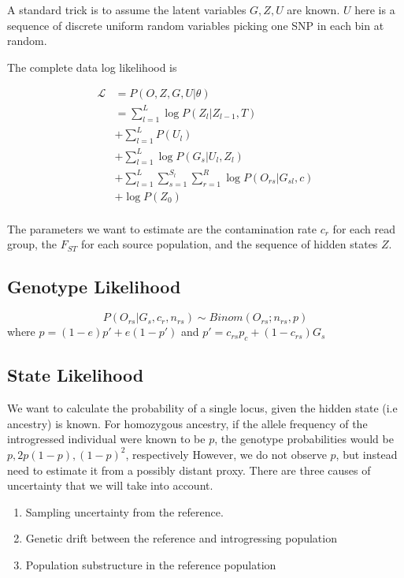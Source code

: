\documentclass[10pt,a4paper]{article}
\begin{document}
A standard trick is to assume the latent variables $G, Z, U$ are known. $U$ here is a sequence of discrete uniform random variables picking one SNP in each bin at random.

The complete data log likelihood is

\begin{align}
\mathcal{L}  &= P(O, Z, G, U | \theta)  \nonumber\\
&= \sum_{l=1}^L  \log P(Z_l |Z_{l-1}, T)\nonumber\\
&+ \sum_{l=1}^L P(U_l) \\
&+ \sum_{l=1}^L \log P(G_s | U_l, Z_l)\nonumber\\
&+ \sum_{l=1}^L\sum_{s=1}^{S_l}\sum_{r=1}^R \log P(O_{rs} | G_{sl}, c)\nonumber\\
& +\log P(Z_0)  \label{eq:ll:correct}\\
\end{align}

The parameters we want to estimate are the contamination rate $c_r$ for each read group, the $F_{ST}$ for each source population, and the sequence of hidden states $Z$.

\subsection{Genotype Likelihood}
\begin{equation}
P(O_{rs}| G_s, c_r, n_{rs}) \sim Binom(O_{rs}; n_{rs}, p) \label{eq:ll:geno}
\end{equation}
where $p = (1-e) p' + e (1-p')$
and $p' =c_{rs} p_c + (1-c_{rs}) G_s$
\subsection{State Likelihood}
We want to calculate the probability of a single locus, given the hidden state (i.e ancestry) is known. For homozygous ancestry, if the allele frequency of the introgressed individual were known to be $p$, the genotype probabilities would be $p, 2p(1-p), (1-p)^2$, respectively However, we do not observe $p$, but instead need  to estimate it from a possibly distant proxy. There are three causes of uncertainty that we will take into account.
\begin{enumerate}
	\item Sampling uncertainty from the reference.	
	\item Genetic drift between the reference and introgressing population
	\item Population substructure in the reference population
\end{enumerate}
\end{document}
